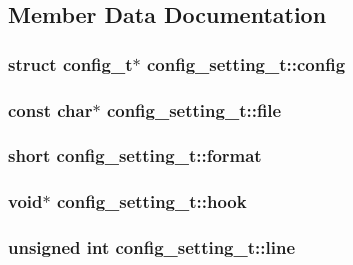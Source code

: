 \subsection{Member Data Documentation}
\hypertarget{structconfig__setting__t_a8d6d8450cc6e3485d9f2da3302c231f4}{
\subsubsection[{config}]{\setlength{\rightskip}{0pt plus 5cm}struct {\bf config\-\_\-t}$\ast$ config\-\_\-setting\-\_\-t\-::config}}\label{structconfig__setting__t_a8d6d8450cc6e3485d9f2da3302c231f4}
\hypertarget{structconfig__setting__t_af28d89c366212409e49f5dd52c9b7240}{
\subsubsection[{file}]{\setlength{\rightskip}{0pt plus 5cm}const char$\ast$ config\-\_\-setting\-\_\-t\-::file}}\label{structconfig__setting__t_af28d89c366212409e49f5dd52c9b7240}
\hypertarget{structconfig__setting__t_a8957b2dcbf59fcfd00a3abe41bd0d7b5}{
\subsubsection[{format}]{\setlength{\rightskip}{0pt plus 5cm}short config\-\_\-setting\-\_\-t\-::format}}\label{structconfig__setting__t_a8957b2dcbf59fcfd00a3abe41bd0d7b5}
\hypertarget{structconfig__setting__t_aa8238d7d2cc16b51eac47e82867494a5}{
\subsubsection[{hook}]{\setlength{\rightskip}{0pt plus 5cm}void$\ast$ config\-\_\-setting\-\_\-t\-::hook}}\label{structconfig__setting__t_aa8238d7d2cc16b51eac47e82867494a5}
\hypertarget{structconfig__setting__t_a11fc7f855c8200ea53458451d0ef0e9c}{
\subsubsection[{line}]{\setlength{\rightskip}{0pt plus 5cm}unsigned int config\-\_\-setting\-\_\-t\-::line}}\label{structconfig__setting__t_a11fc7f855c8200ea53458451d0ef0e9c}
